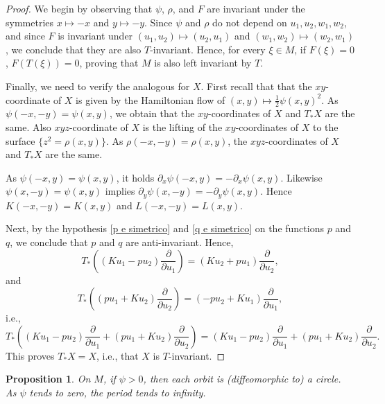 \documentclass[11pt,reqno]{amsart}
\theoremstyle{plain}
\newtheorem{prop}[theorem]{Proposition}
\theoremstyle{definition}
\theoremstyle{remark}
\theoremstyle{plain}
\numberwithin{equation}{section}
\begin{document}
							\begin{proof}
								We begin by observing that $\psi$, $\rho$, and $F$ are invariant under the symmetries $x\mapsto -x$ and $y\mapsto -y$. Since $\psi$ and $\rho$ do not depend on $u_{1},u_{2},w_{1}, w_{2}$, and since $F$ is invariant under $(u_{1},u_{2})\mapsto  (u_{2},u_{1})$ and $(w_{1},w_{2})\mapsto  (w_{2},w_{1})$, we conclude that they are  also $T$-invariant. Hence, for every $\xi \in M$, if $F(\xi)=0$, $F(T(\xi))=0$, proving that $M$ is also left invariant by $T$. 
								

								Finally, we need to verify the analogous for $X$. First recall that that the $xy$-coordinate of $X$ is given by the Hamiltonian flow of $(x,y)\mapsto \frac{1}{2}\psi(x,y)^2$. As $\psi(-x,-y)=\psi(x,y)$, we obtain that the $xy$-coordinates of $X$ and $T_* X$ are the same. 
								Also $xyz$-coordinate of $X$ is the lifting of the $xy$-coordinates of $X$ to the surface $\{ z^2= \rho(x,y)\}$. As $\rho(-x,-y)= \rho(x,y)$, the $xyz$-coordinates of $X$ and $T_* X$ are the same.
								
								As $\psi(-x,y)= \psi(x,y)$, it holds $\partial_x\psi(-x,y) =-\partial_x\psi(x,y)$. Likewise $\psi(x,-y)= \psi(x,y)$ implies $\partial_y\psi(x,-y) =-\partial_y\psi(x,y)$. Hence $K(-x,-y)= K(x,y)$ and  $L(-x,-y)= L(x,y)$.
								
								 Next, by the hypothesis \ref{p e simetrico} and \ref{q e simetrico} on the functions $p$ and $q$, we conclude that $p$ and $q$ are anti-invariant. Hence, $$T_{\ast}\left((Ku_{1}-pu_{2})\frac{\partial}{\partial u_{1}}\right)=(Ku_{2}+pu_{1})\frac{\partial}{\partial u_{2}},$$ and $$T_{\ast}\left((pu_{1}+Ku_{2})\frac{\partial}{\partial u_{2}}\right)=(-pu_{2}+Ku_{1})\frac{\partial}{\partial u_{1}},$$ i.e.,$$T_{\ast}\left((Ku_{1}-pu_{2})\frac{\partial}{\partial u_{1}}+(pu_{1}+Ku_{2})\frac{\partial}{\partial u_{2}}\right)=(Ku_{1}-pu_{2})\frac{\partial}{\partial u_{1}}+(pu_{1}+Ku_{2})\frac{\partial}{\partial u_{2}}.$$ This proves $T_{\ast}X=X$, i.e., that $X$ is $T$-invariant. 
								\end{proof}
								
								\begin{prop} \label{prop: psi>0 orbitas circulos pra psi}
								On $M$, if $\psi>0$, then each orbit is (diffeomorphic to) a circle. As $\psi$ tends to zero, the period tends to infinity.
								\end{prop}
								
\end{document}
